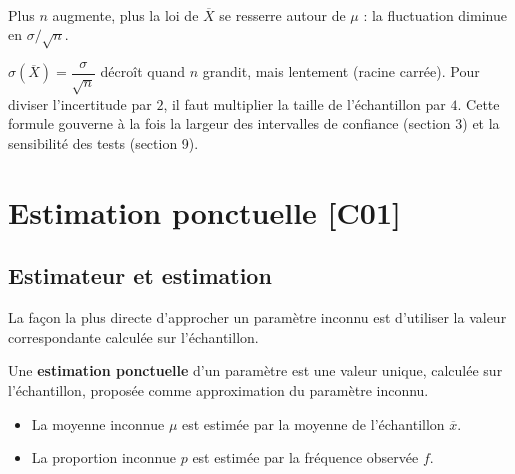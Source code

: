 \documentclass[a4paper,11pt]{article}
\newcommand{\gaussN}[1]{1/sqrt(2*pi)*exp(-((#1)^2)/2)}
\begin{document}
\begin{center}
\\
{\footnotesize\color{uimmgray} Plus $n$ augmente, plus la loi de $\overline{X}$ se resserre autour de $\mu$ : la fluctuation diminue en $\sigma/\sqrt{n}$.}
\end{center}

\begin{remarque}
$\sigma(\overline{X}) = \dfrac{\sigma}{\sqrt{n}}$ décroît quand $n$ grandit, mais lentement (racine carrée). Pour diviser l'incertitude par $2$, il faut multiplier la taille de l'échantillon par $4$. Cette formule gouverne à la fois la largeur des intervalles de confiance (section 3) et la sensibilité des tests (section 9).
\end{remarque}

\newpage
\section{Estimation ponctuelle \hfill {\normalsize\color{uimmred}[C01]}}

\subsection{Estimateur et estimation}

La façon la plus directe d'approcher un paramètre inconnu est d'utiliser la valeur correspondante calculée sur l'échantillon.

\begin{definition}
Une \textbf{estimation ponctuelle} d'un paramètre est une valeur unique, calculée sur l'échantillon, proposée comme approximation du paramètre inconnu.
\begin{itemize}
  \item La moyenne inconnue $\mu$ est estimée par la moyenne de l'échantillon $\overline{x}$.
  \item La proportion inconnue $p$ est estimée par la fréquence observée $f$.
\end{itemize}
\end{definition}
\end{document}
